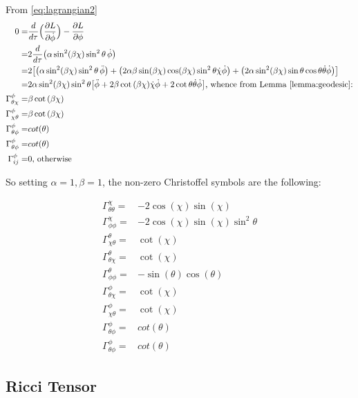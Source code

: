\documentclass[]{article}
\begin{document}
From \eqref{eq:lagrangian2}
\begin{align*}
0=&\frac{d}{d \tau}\Big(\frac{\partial L}{\partial \dot{\phi}}\Big)-\frac{\partial L}{\partial \phi}\\
=&2\frac{d}{d \tau}\big(\alpha \sin^2(\beta \chi) \sin^2 \theta\, \dot \phi\big)\\
=&2\big[\big(\alpha \sin^2(\beta \chi) \sin^2 \theta\, \ddot \phi\big) + \big(2 \alpha \beta \sin(\beta \chi) \cos(\beta \chi) \sin^2 \theta \dot{\chi}\dot \phi\big) + \big(2\alpha \sin^2(\beta \chi) \sin \theta \cos\theta \dot\theta \dot \phi\big)\big]\\
=&2\alpha \sin^2(\beta \chi) \sin^2 \theta\big[\ddot{\phi}+2 \beta \cot{(\beta\chi)} \dot{\chi}\dot{\phi}+2\cot{\theta\dot\theta \dot \phi}\big]\text{, whence from Lemma \ref{lemma:geodesic}:}\\
\Gamma^{\phi}_{\theta\chi}=&\beta\cot{(\beta\chi)}\\
\Gamma^{\phi}_{\chi\theta}=&\beta\cot{(\beta\chi)}\\
\Gamma^{\phi}_{\theta\phi}=&cot{(\theta)}\\
\Gamma^{\phi}_{\theta\phi}=&cot{(\theta)}\\
\Gamma^{\phi}_{ij}=&0\text{, otherwise}
\end{align*}


So setting $\alpha=1,\beta=1$, the non-zero Christoffel symbols are the following: 

\begin{align*}
\Gamma^{\chi}_{\theta\theta}=&-2 \cos{(\chi)}\sin{(\chi)}\\
\Gamma^{\chi}_{\phi\phi}=&-2 \cos{(\chi)}\sin{(\chi)}\sin^2 \theta\\
\Gamma^{\theta}_{\chi\theta}=&\cot{(\chi)}\\
\Gamma^{\theta}_{\theta\chi}=&\cot{(\chi)}\\
\Gamma^{\theta}_{\phi\phi}=&-\sin{(\theta)}\cos{(\theta)}\\
\Gamma^{\phi}_{\theta\chi}=&\cot{(\chi)}\\
\Gamma^{\phi}_{\chi\theta}=&\cot{(\chi)}\\
\Gamma^{\phi}_{\theta\phi}=&cot{(\theta)}\\
\Gamma^{\phi}_{\theta\phi}=&cot{(\theta)}
\end{align*}



\subsection{Ricci Tensor}\label{Ricci-Tensor-3}
\end{document}
